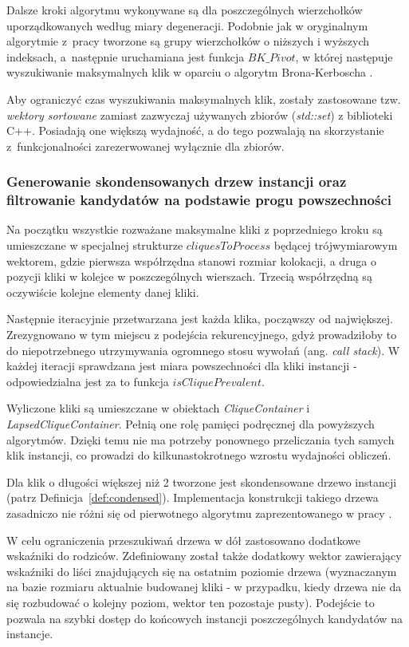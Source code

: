 \documentclass[12pt]{article}
\begin{document}
Dalsze kroki algorytmu wykonywane są dla poszczególnych wierzchołków uporządkowanych według miary degeneracji. Podobnie jak w oryginalnym algorytmie z~pracy \cite{pivot} tworzone są grupy wierzchołków o niższych i wyższych indeksach, a~następnie uruchamiana jest funkcja $ BK\_Pivot $, w której następuje wyszukiwanie maksymalnych klik w oparciu o algorytm Brona-Kerboscha \cite{kerbosz}. 

Aby ograniczyć czas wyszukiwania maksymalnych klik, zostały zastosowane tzw. \textit{wektory sortowane} zamiast zazwyczaj używanych zbiorów (\textit{std::set}) z biblioteki C++. Posiadają one większą wydajność, a do tego pozwalają na skorzystanie z~funkcjonalności zarezerwowanej wyłącznie dla zbiorów.

\subsubsection{Generowanie skondensowanych drzew instancji oraz filtrowanie kandydatów na podstawie progu powszechności}

Na początku wszystkie rozważane maksymalne kliki z poprzedniego kroku są umieszczane w specjalnej strukturze $ cliquesToProcess $ będącej trójwymiarowym wektorem, gdzie pierwsza współrzędna stanowi rozmiar kolokacji, a druga o pozycji kliki w kolejce w poszczególnych wierszach. Trzecią współrzędną są oczywiście kolejne elementy danej kliki.

Następnie iteracyjnie przetwarzana jest każda klika, począwszy od największej. Zrezygnowano w tym miejscu z podejścia rekurencyjnego, gdyż prowadziłoby to do niepotrzebnego utrzymywania ogromnego stosu wywołań (ang. \textit{call stack}). W każdej iteracji sprawdzana jest miara powszechności dla kliki instancji - odpowiedzialna jest za to funkcja $ isCliquePrevalent $. 

Wyliczone kliki są umieszczane w obiektach \textit{CliqueContainer} i \textit{LapsedCliqueContainer}. Pełnią one rolę pamięci podręcznej dla powyższych algorytmów. Dzięki temu nie ma potrzeby ponownego przeliczania tych samych klik instancji, co prowadzi do kilkunastokrotnego wzrostu wydajności obliczeń.

Dla klik o długości większej niż 2 tworzone jest skondensowane drzewo instancji (patrz Definicja~\ref{def:condensed}). Implementacja konstrukcji takiego drzewa zasadniczo nie różni się od pierwotnego algorytmu zaprezentowanego w pracy \cite{chinczyki}.

W celu ograniczenia przeszukiwań drzewa w dół zastosowano dodatkowe wskaźniki do rodziców. Zdefiniowany został także dodatkowy wektor zawierający wskaźniki do liści znajdujących się na ostatnim poziomie drzewa (wyznaczanym na bazie rozmiaru aktualnie budowanej kliki - w przypadku, kiedy drzewa nie da się rozbudować o kolejny poziom, wektor ten pozostaje pusty). Podejście to pozwala na szybki dostęp do końcowych instancji poszczególnych kandydatów na instancje.
\end{document}
